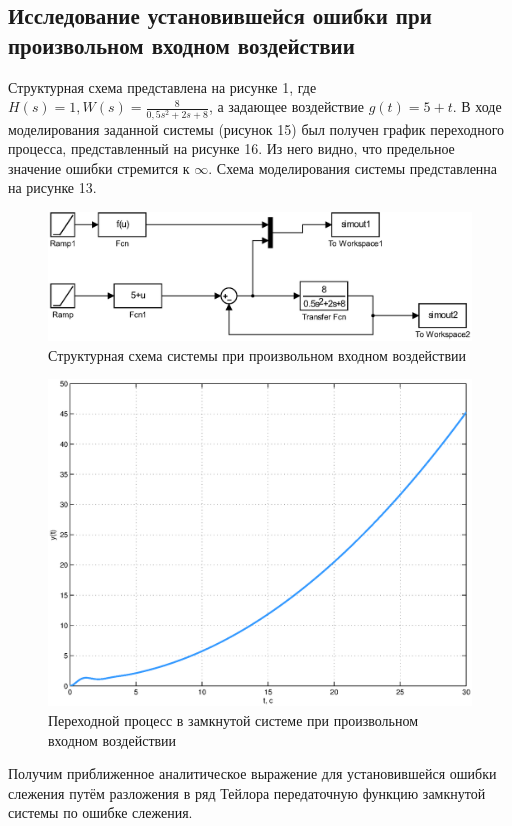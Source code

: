 \documentclass[12pt,a4paper]{article}
\begin{document}
\newpage
\begin{center}
\section{Исследование установившейся ошибки при произвольном входном воздействии}
\end{center}\par
 Структурная схема представлена на рисунке 1, где $H(s) = 1, W(s) = \displaystyle{\frac{8}{0,5s^2 + 2s + 8}}$, а задающее воздействие $g(t) = {5 + t}$.
 В ходе моделирования заданной системы (рисунок 15) был получен график переходного процесса, представленный на рисунке 16. Из него видно, что предельное значение ошибки стремится к $\infty$. Схема моделирования системы представленна на рисунке 13.
\begin{figure}[H]
    \centering
    \includegraphics[width=0.8\linewidth]{scheme/scheme5.eps}
    \caption{Структурная схема системы при произвольном входном воздействии}
\end{figure}
\begin{figure}[H]
    \centering
    \includegraphics[width=0.8\linewidth]{scheme/plot13y.eps}
    \caption{Переходной процесс в замкнутой системе при произвольном входном воздействии}
\end{figure}
Получим приближенное аналитическое выражение для установившейся ошибки слежения путём разложения в ряд Тейлора передаточную функцию замкнутой системы по ошибке слежения.
\end{document}
